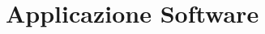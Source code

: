 \section{Applicazione Software}
\begin{comment}
\begin{lstlisting}[caption={Example C Code}]
... definizioni e inclusioni necessarie ...

const char *STATUS[] = {
    "Consegnato",
    "In Consegna",
    "Spedito",
    "Autorizzato",
    "Fase di Controllo"};

... altri enum per evitare errori di battitura ...

... funzioni per la connessione al database ...

void printResult(int rows, int cols, PGresult *res)
{
    for (int i = 0; i < rows; i++)
    {
        for (int j = 0; j < cols; j++)
        {
            printf("%
        }
        printf("\n");
    }
}

int main(int argc, char **argv)
{
    .
    .
    .
    int end = 0;
    while (end != 1)
    {
        printf("Premi invio per continuare...\n");
        getchar();

        int scelta;
        printf("Che query vuoi eseguire?\n A tua disposizione abbiamo queste 5 opzioni:\n");
        printf("\t1. Media del costo dei pacchi di un corriere di un certo grado che sono passati per una filiale di un certo tipo\n\t2. Numero pacchi per bundle con un determinato tipo di assicurazione\n\t3. Corrieri con tempi di consegna maggiori alla media\n\t4. Corrieri con bundle con pacchi assicurati o regalo e costo specifici\n\t5. Status attuale dei pacchi\n");
        printf("Qual'è la tua scelta? (1-5): ");
        scanf("%
        while (scelta < 1 || scelta > 5)
        {
            printf("\tHai scelto... molto MALE!\n\tTrovo insopportabile la sua mancanza di Input corretto\n");
            printf("Le scelte sono 5, riprova: ");
            scanf("%
        }
        printf("\tHai scelto molto bene!  (cit)\n\n");
        PGresult *res;

        if (scelta == 1)
        {
            const char *query1 = "SELECT corriere, AVG(p.costo) AS costo_medio "
                                 "FROM pacco AS p "
                                 "JOIN tracking AS t ON t.id_pacco = p.id "
                                 "JOIN filiale AS f ON t.città_check_point = f.città AND t.nome_check_point=f.nome "
                                 "JOIN corriere AS c ON p.corriere = c.cf "
                                 "WHERE f.tipo = $1 AND c.grado = $2 "
                                 "GROUP BY corriere;";
            res = PQprepare(conn, "query1", query1, 2, NULL);
            if (PQresultStatus(res) != PGRES_COMMAND_OK)
            {
                fprintf(stderr, "Prepare failed: %
                PQclear(res);
            }
            PQclear(res);


\end{comment}
